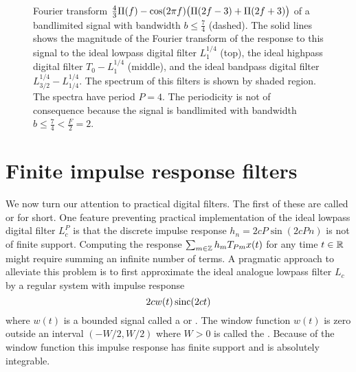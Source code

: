 \begin{figure}[tp]
  \caption{Fourier transform $\tfrac{4}{3}\Pi(f) - \cos(2\pi f) \big( \Pi(2f - 3) + \Pi(2f + 3) \big)$ of a bandlimited signal with bandwidth $b \leq \tfrac{7}{4}$ (dashed). The solid lines shows the magnitude of the Fourier transform of the response to this signal to the ideal lowpass digital filter $L_1^{1/4}$ (top), the ideal highpass digital filter $T_0 - L_1^{1/4}$ (middle), and the ideal bandpass digital filter $L_{3/2}^{1/4} - L_{1/4}^{1/4}$.  The spectrum of this filters is shown by shaded region. The spectra have period $P = 4$.  The periodicity is not of consequence because the signal is bandlimited with bandwidth $b \leq \tfrac{7}{4} < \tfrac{F}{2} = 2$.} \label{fig:bandlimiteddiscretetimefiltering}
\end{figure}


\section{Finite impulse response filters}\label{sec:finite-impulse-resp}

We now turn our attention to practical digital filters.  The first of these are called  or  for short.  One feature preventing practical implementation of the ideal lowpass digital filter $L_c^P$ is that the discrete impulse response $h_n = 2cP\sin(2cPn)$ is not of finite support.  Computing the response $\sum_{m \in {\mathbb Z}} h_m T_{Pm} x(t)$ for any time $t \in {\mathbb R}$ might require summing an infinite number of terms.  A pragmatic approach to alleviate this problem is to first approximate the ideal analogue lowpass filter $L_c$ by a regular system with impulse response
\[
2c w(t) \operatorname{sinc}(2ct)
\]
where $w(t)$ is a bounded signal called a  or .  The window function $w(t)$ is zero outside an interval $(-W/2, W/2)$ where $W > 0$ is called the .  Because of the window function this impulse response has finite support and is absolutely integrable.  

